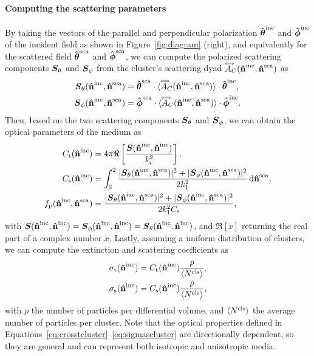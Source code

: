 \paragraph{Computing the scattering parameters}
By taking the vectors of the parallel and perpendicular polarization $\mathbf{\hat{\boldsymbol\theta}}^\text{inc}$ and $\mathbf{\hat{\boldsymbol\phi}}^\text{inc}$ of the incident field as shown in Figure~\ref{fig:diagram} (right), and equivalently for the scattered field $\mathbf{\hat{\boldsymbol\theta}}^\text{sca}$ and $\mathbf{\hat{\boldsymbol\phi}}^\text{sca}$, we can compute the polarized scattering components $\boldsymbol{S}_\theta$ and $\boldsymbol{S}_\phi$ from the cluster's scattering dyad $\accentset{\Longleftrightarrow}{A}_C(\mathbf{\hat{n}}^{\text{inc}},\mathbf{\hat{n}}^{\text{sca}})$ as
%
\begin{align}
  \boldsymbol{S}_\theta(\mathbf{\hat{n}}^{\text{inc}},\mathbf{\hat{n}}^{\text{sca}}) &= \mathbf{\hat{\boldsymbol\theta}}^\text{sca} \cdot {\langle \accentset{\Longleftrightarrow}{A}_C(\mathbf{\hat{n}}^{\text{inc}},\mathbf{\hat{n}}^{\text{sca}}) \rangle} \cdot \mathbf{\hat{\boldsymbol\theta}}^\text{inc}, \nonumber \\
  \boldsymbol{S}_\phi(\mathbf{\hat{n}}^{\text{inc}},\mathbf{\hat{n}}^{\text{sca}}) &= \mathbf{\hat{\boldsymbol\phi}}^\text{sca} \cdot {\langle \accentset{\Longleftrightarrow}{A}_C(\mathbf{\hat{n}}^{\text{inc}},\mathbf{\hat{n}}^{\text{sca}}) \rangle} \cdot \mathbf{\hat{\boldsymbol\phi}}^\text{inc}.
\end{align}
%
Then, based on the two scattering components $\boldsymbol{S}_\theta$ and $\boldsymbol{S}_\phi$, we can obtain the optical parameters of the medium as
%
\begin{align}
    \label{eq:crosstcluster}
    \cT(\dwi) &= 4\pi \Re\left[\frac{\ScaMatrix(\dwi,\dwi)}{k_i^2}\right], \\
    \label{eq:crossscluster}
    \cS(\dwi) &=\int_\Sph \frac{|\ScaMatrix_\theta(\dwi,\dws)|^2+|\ScaMatrix_\phi(\dwi,\dws)|^2}{2k_1^2} \diff{\dws}, \\
    \label{eq:phasecluster}
    \phase(\dwi,\dws) &= \frac{|\ScaMatrix_\theta(\dwi,\dws)|^2+|\ScaMatrix_\phi(\dwi,\dws)|^2}{2k_1^2\cS},
\end{align}
%
with $\boldsymbol{S}(\mathbf{\hat{n}}^{\text{inc}},\mathbf{\hat{n}}^{\text{inc}})=\boldsymbol{S}_\phi(\mathbf{\hat{n}}^{\text{inc}},\mathbf{\hat{n}}^{\text{inc}})=\boldsymbol{S}_\theta(\mathbf{\hat{n}}^{\text{inc}},\mathbf{\hat{n}}^{\text{inc}})$, and $\Re[x]$ returning the real part of a complex number $x$. Lastly, assuming a uniform distribution of clusters, we can compute the extinction and scattering coefficients as
%
\begin{align}
    \label{eq:sigmatcluster}
    \sigT(\dwi) &= \cT(\dwi) \frac{\rho}{\EV{\Ncls}}, \\
    \label{eq:sigmascluster}
    \sigS(\dwi) &= \cS(\dwi) \frac{\rho}{\EV{\Ncls}},
\end{align}
%
with $\rho$ the number of particles per differential volume, and ${\langle {N^\text{cls}} \rangle}$ the average number of particles per cluster. Note that the optical properties defined in Equations~\eqref{eq:crosstcluster}--\eqref{eq:sigmascluster} are directionally dependent, so they are general and can represent both isotropic and anisotropic media. 

